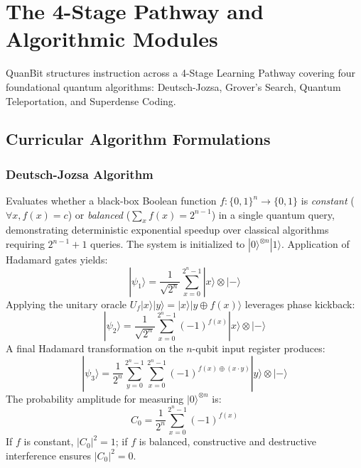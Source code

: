 \documentclass[conference]{IEEEtran}
\begin{document}
\section{The 4-Stage Pathway and Algorithmic Modules}
\label{sec:curriculum}

QuanBit structures instruction across a 4-Stage Learning Pathway covering four foundational quantum algorithms: Deutsch-Jozsa, Grover's Search, Quantum Teleportation, and Superdense Coding.

\subsection{Curricular Algorithm Formulations}

\subsubsection{Deutsch-Jozsa Algorithm}
Evaluates whether a black-box Boolean function $f: \{0,1\}^n \to \{0,1\}$ is \textit{constant} ($\forall x, f(x)=c$) or \textit{balanced} ($\sum_x f(x) = 2^{n-1}$) in a single quantum query, demonstrating deterministic exponential speedup over classical algorithms requiring $2^{n-1} + 1$ queries.
The system is initialized to $|0\rangle^{\otimes n}|1\rangle$. Application of Hadamard gates yields:
\begin{equation}
|\psi_1\rangle = \frac{1}{\sqrt{2^n}}\sum_{x=0}^{2^n-1}|x\rangle \otimes |-\rangle
\end{equation}
Applying the unitary oracle $U_f |x\rangle|y\rangle = |x\rangle|y \oplus f(x)\rangle$ leverages phase kickback:
\begin{equation}
|\psi_2\rangle = \frac{1}{\sqrt{2^n}}\sum_{x=0}^{2^n-1}(-1)^{f(x)}|x\rangle \otimes |-\rangle
\end{equation}
A final Hadamard transformation on the $n$-qubit input register produces:
\begin{equation}
|\psi_3\rangle = \frac{1}{2^n}\sum_{y=0}^{2^n-1}\sum_{x=0}^{2^n-1}(-1)^{f(x) \oplus (x \cdot y)} |y\rangle \otimes |-\rangle
\end{equation}
The probability amplitude for measuring $|0\rangle^{\otimes n}$ is:
\begin{equation}
C_{0} = \frac{1}{2^n}\sum_{x=0}^{2^n-1}(-1)^{f(x)}
\end{equation}
If $f$ is constant, $|C_0|^2 = 1$; if $f$ is balanced, constructive and destructive interference ensures $|C_0|^2 = 0$.
\end{document}
